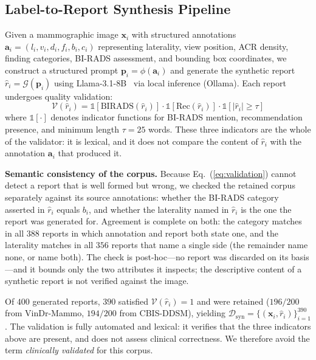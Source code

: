 \documentclass{wlscirep}
\begin{document}
\subsection*{Label-to-Report Synthesis Pipeline}

Given a mammographic image $\mathbf{x}_i$ with structured annotations $\mathbf{a}_i = (l_i, v_i, d_i, f_i, b_i, c_i)$ representing laterality, view position, ACR density, finding categories, BI-RADS assessment, and bounding box coordinates, we construct a structured prompt $\mathbf{p}_i = \phi(\mathbf{a}_i)$ and generate the synthetic report $\hat{r}_i = \mathcal{G}(\mathbf{p}_i)$ using Llama-3.1-8B~\cite{dubey2024llama3} via local inference (Ollama). Each report undergoes quality validation:
\begin{equation}
\mathcal{V}(\hat{r}_i) = \mathbb{1}[\text{BIRADS}(\hat{r}_i)] \cdot \mathbb{1}[\text{Rec}(\hat{r}_i)] \cdot \mathbb{1}[|\hat{r}_i| \geq \tau]
\label{eq:validation}
\end{equation}
where $\mathbb{1}[\cdot]$ denotes indicator functions for BI-RADS mention, recommendation presence, and minimum length $\tau=25$ words. These three indicators are the whole of the validator: it is lexical, and it does not compare the content of $\hat{r}_i$ with the annotation $\mathbf{a}_i$ that produced it.

\textbf{Semantic consistency of the corpus.} Because Eq.~(\ref{eq:validation}) cannot detect a report that is well formed but wrong, we checked the retained corpus separately against its source annotations: whether the BI-RADS category asserted in $\hat{r}_i$ equals $b_i$, and whether the laterality named in $\hat{r}_i$ is the one the report was generated for. Agreement is complete on both: the category matches in all $388$ reports in which annotation and report both state one, and the laterality matches in all $356$ reports that name a single side (the remainder name none, or name both). The check is post-hoc---no report was discarded on its basis---and it bounds only the two attributes it inspects; the descriptive content of a synthetic report is not verified against the image.

Of $400$ generated reports, $390$ satisfied $\mathcal{V}(\hat{r}_i)=1$ and were retained ($196/200$ from VinDr-Mammo, $194/200$ from CBIS-DDSM), yielding $\mathcal{D}_{\text{syn}} = \{(\mathbf{x}_i, \hat{r}_i)\}_{i=1}^{390}$. The validation is fully automated and lexical: it verifies that the three indicators above are present, and does not assess clinical correctness. We therefore avoid the term \emph{clinically validated} for this corpus.
\end{document}

